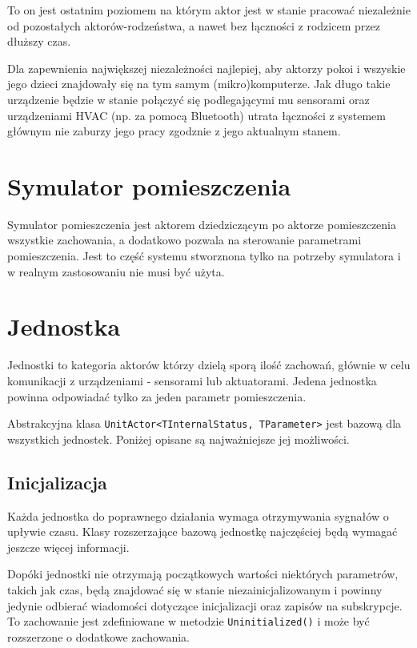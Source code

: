 To on jest ostatnim poziomem na którym aktor jest w stanie pracować niezależnie od pozostałych aktorów-rodzeństwa, a nawet bez łączności z rodzicem przez dłuższy czas. 

Dla zapewnienia największej niezależności najlepiej, aby aktorzy pokoi i wszyskie jego dzieci znajdowały się na tym samym (mikro)komputerze. Jak długo takie urządzenie będzie w stanie połączyć się podlegającymi mu sensorami oraz urządzeniami HVAC (np. za pomocą Bluetooth) utrata łączności z systemem głównym nie zaburzy jego pracy zgodznie z jego aktualnym stanem.

\section{Symulator pomieszczenia}

Symulator pomieszczenia jest aktorem dziedziczącym po aktorze pomieszczenia wszystkie zachowania, a dodatkowo pozwala na sterowanie parametrami pomieszczenia. Jest to część systemu stworznona tylko na potrzeby symulatora i w realnym zastosowaniu nie musi być użyta.

\section{Jednostka} \label{sec:unit}
Jednostki to kategoria aktorów którzy dzielą sporą ilość zachowań, głównie w celu komunikacji z urządzeniami - sensorami lub aktuatorami. Jedena jednostka powinna odpowiadać tylko za jeden parametr pomieszczenia.

Abstrakcyjna klasa \lstinline{UnitActor<TInternalStatus, TParameter>} jest bazową dla wszystkich jednostek. Poniżej opisane są najważniejsze jej możliwości.

\subsection*{Inicjalizacja}
Każda jednostka do poprawnego działania wymaga otrzymywania sygnałów o upływie czasu. Klasy rozszerzające bazową jednostkę najczęściej będą wymagać jeszcze więcej informacji. 

Dopóki jednostki nie otrzymają początkowych wartości niektórych parametrów, takich jak czas, będą znajdować się w stanie niezainicjalizowanym i powinny jedynie odbierać wiadomości dotyczące inicjalizacji oraz zapisów na subskrypcje.
To zachowanie jest zdefiniowane w metodzie \lstinline{Uninitialized()} i może być rozszerzone o dodatkowe zachowania.

